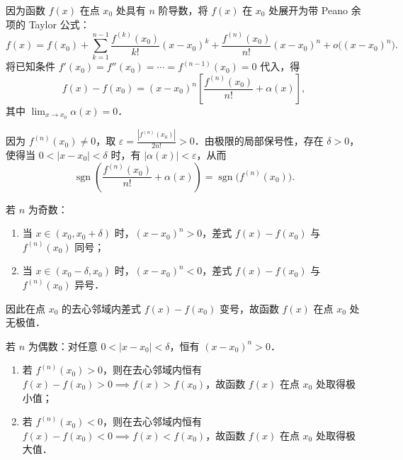 \begin{myproof}
    因为函数 $f(x)$ 在点 $x_0$ 处具有 $n$ 阶导数，将 $f(x)$ 在 $x_0$ 处展开为带 Peano 余项的 Taylor 公式：
    \begin{equation}
        f(x) = f(x_0) + \sum_{k=1}^{n-1} \frac{f^{(k)}(x_0)}{k!}(x - x_0)^k + \frac{f^{(n)}(x_0)}{n!}(x - x_0)^n + o\bigl((x - x_0)^n\bigr).
    \end{equation}
    将已知条件 $f'(x_0) = f''(x_0) = \cdots = f^{(n-1)}(x_0) = 0$ 代入，得
    \begin{equation}
        f(x) - f(x_0) = (x - x_0)^n \left[ \frac{f^{(n)}(x_0)}{n!} + \alpha(x) \right],
    \end{equation}
    其中 $\lim_{x\to x_0} \alpha(x) = 0$．

    因为 $f^{(n)}(x_0) \neq 0$，取 $\varepsilon = \frac{|f^{(n)}(x_0)|}{2 n!} > 0$．由极限的局部保号性，存在 $\delta > 0$，使得当 $0 < |x - x_0| < \delta$ 时，有 $|\alpha(x)| < \varepsilon$，从而
    \begin{equation}
        \operatorname{sgn}\left( \frac{f^{(n)}(x_0)}{n!} + \alpha(x) \right) = \operatorname{sgn}\bigl( f^{(n)}(x_0) \bigr).
    \end{equation}


    若 $n$ 为奇数：
    \begin{enumerate}
        \item 当 $x \in (x_0, x_0 + \delta)$ 时，$(x - x_0)^n > 0$，差式 $f(x) - f(x_0)$ 与 $f^{(n)}(x_0)$ 同号；
        \item 当 $x \in (x_0 - \delta, x_0)$ 时，$(x - x_0)^n < 0$，差式 $f(x) - f(x_0)$ 与 $f^{(n)}(x_0)$ 异号．
    \end{enumerate}
    因此在点 $x_0$ 的去心邻域内差式 $f(x) - f(x_0)$ 变号，故函数 $f(x)$ 在点 $x_0$ 处无极值．


    若 $n$ 为偶数：对任意 $0 < |x - x_0| < \delta$，恒有 $(x - x_0)^n > 0$．
    \begin{enumerate}
        \item 若 $f^{(n)}(x_0) > 0$，则在去心邻域内恒有 $f(x) - f(x_0) > 0 \implies f(x) > f(x_0)$，故函数 $f(x)$ 在点 $x_0$ 处取得极小值；
        \item 若 $f^{(n)}(x_0) < 0$，则在去心邻域内恒有 $f(x) - f(x_0) < 0 \implies f(x) < f(x_0)$，故函数 $f(x)$ 在点 $x_0$ 处取得极大值．
    \end{enumerate}
\end{myproof}

\endinput
